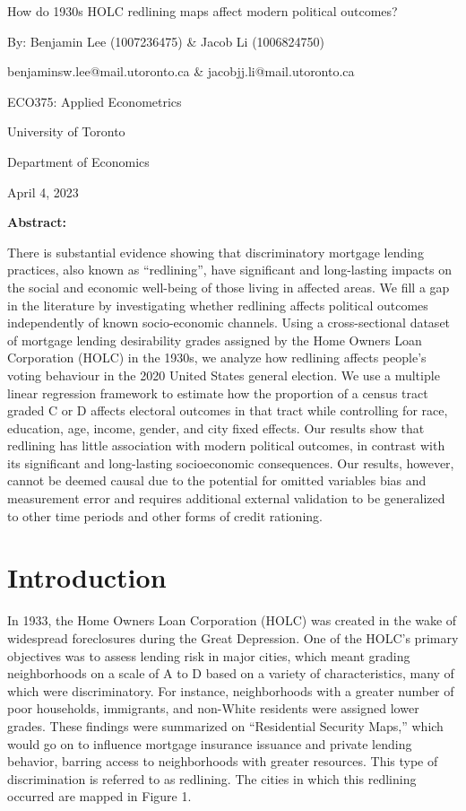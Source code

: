 \documentclass{eco_375_paper}
\begin{document}
\vspace*{\fill}
\begin{center}
	How do 1930s HOLC redlining maps affect modern political outcomes?
	
	By: Benjamin Lee (1007236475) \& Jacob Li (1006824750)
	
	benjaminsw.lee@mail.utoronto.ca \& jacobjj.li@mail.utoronto.ca
	\bigskip
	
	ECO375: Applied Econometrics 
	
	University of Toronto
	
	Department of Economics
	
	April 4, 2023
	
	\bigskip
	\textbf{Abstract: }
	
	There is substantial evidence showing that discriminatory mortgage lending practices, also known as “redlining”, have significant and long-lasting impacts on the social and economic well-being of those living in affected areas. We fill a gap in the literature by investigating whether redlining affects political outcomes independently of known socio-economic channels. Using a cross-sectional dataset of mortgage lending desirability grades assigned by the Home Owners Loan Corporation (HOLC) in the 1930s, we analyze how redlining affects people’s voting behaviour in the 2020 United States general election. We use a multiple linear regression framework to estimate how the proportion of a census tract graded C or D affects electoral outcomes in that tract while controlling for race, education, age, income, gender, and city fixed effects. Our results show that redlining has little association with modern political outcomes, in contrast with its significant and long-lasting socioeconomic consequences. Our results, however, cannot be deemed causal due to the potential for omitted variables bias and measurement error and requires additional external validation to be generalized to other time periods and other forms of credit rationing.
\end{center}
\vspace*{\fill}
\pagebreak

\section*{Introduction}
In 1933, the Home Owners Loan Corporation (HOLC) was created in the wake of widespread foreclosures during the Great Depression. One of the HOLC’s primary objectives was to assess lending risk in major cities, which meant grading neighborhoods on a scale of A to D based on a variety of characteristics, many of which were discriminatory. For instance, neighborhoods with a greater number of poor households, immigrants, and non-White residents were assigned lower grades. These findings were summarized on “Residential Security Maps,” which would go on to influence mortgage insurance issuance and private lending behavior, barring access to neighborhoods with greater resources. This type of discrimination is referred to as redlining. The cities in which this redlining occurred are mapped in Figure 1.
\end{document}
